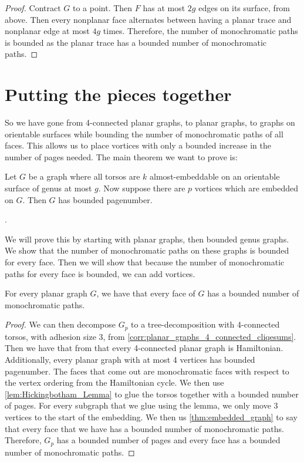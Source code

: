 \begin{proof}
	Contract \(G\) to a point. Then \(F\) has at most \(2g\) edges on its surface, from above. 
	Then every nonplanar face alternates between having a planar trace and nonplanar edge at most \(4g\) times. Therefore, the number of monochromatic paths is bounded as the planar trace has a bounded number of monochromatic paths. 
\end{proof}

\section{Putting the pieces together}
So we have gone from 4-connected planar graphs, to planar graphs, to graphs on orientable surfaces while bounding the number of monochromatic paths of all faces. This allows us to place vortices with only a bounded increase in the number of pages needed. 
The main theorem we want to prove is:
\begin{theorem}\label{thm:orientablevortices}
	Let $G$ be a graph where all torsos are $k$ almost-embeddable on an orientable surface of genus at most $g$.  Now suppose there are $p$ vortices which are embedded on $G$. Then $G$ has bounded pagenumber.
\end{theorem}
. 

We will prove this by starting with planar graphs, then bounded genus graphs. We show that the number of monochromatic paths on these graphs is bounded for every face. Then we will show that because the number of monochromatic paths for every face is bounded, we can add vortices.

\begin{lemma}\label{lem:planargraphs_monochromatic_paths}
	For every planar graph $G$, we have that every face of $G$ has a bounded number of monochromatic paths.
\end{lemma}
\begin{proof}
	We can then decompose $G_p$ to a tree-decomposition with 4-connected torsos, with adhesion size 3, from \cref{corr:planar_graphs_4_connected_cliqesums}. Then we have that from \textcite{tutteTheoremPlanarGraphs1956} that every 4-connected planar graph is Hamiltonian. Additionally, every planar graph with at most 4 vertices has bounded pagenumber.
	The faces that come out are monochromatic faces with respect to the vertex ordering from the Hamiltonian cycle.
	We then use \cref{lem:Hickingbotham_Lemma} to glue the torsos together with a bounded number of pages. For every subgraph that we glue using the lemma, we only move 3 vertices to the start of the embedding. We then us \cref{thm:embedded_graph} to say that every face that we have has a bounded number of monochromatic paths.
	Therefore, $G_p$ has a bounded number of pages and every face has a bounded number of monochromatic paths. 
\end{proof}


